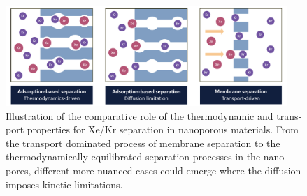 \documentclass[thesis]{subfiles}
\begin{document}
\begin{otherlanguage}{french}
\begin{figure}[ht]
    \centering
      \includegraphics[width=0.95\textwidth]{figures/5-diffusion/Diffusion.pdf}
      \caption{Illustration of the comparative role of the thermodynamic and transport properties for Xe/Kr separation in nanoporous materials. From the transport dominated process of membrane separation to the thermodynamically equilibrated separation processes in the nanopores, different more nuanced cases could emerge where the diffusion imposes kinetic limitations.}\label{fgr:intro_diffusion}
  \end{figure}



\end{otherlanguage}
\end{document}
